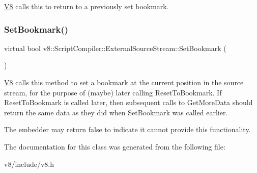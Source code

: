 \mbox{\hyperlink{classv8_1_1V8}{V8}} calls this to return to a previously set bookmark. \mbox{\label{classv8_1_1ScriptCompiler_1_1ExternalSourceStream_a6848508547b3508a2d016738f12561e8}} 
\subsubsection{\texorpdfstring{Set\+Bookmark()}{SetBookmark()}}
{\footnotesize\ttfamily virtual bool v8\+::\+Script\+Compiler\+::\+External\+Source\+Stream\+::\+Set\+Bookmark (\begin{DoxyParamCaption}{ }\end{DoxyParamCaption})\hspace{0.3cm}{\ttfamily [virtual]}}

\mbox{\hyperlink{classv8_1_1V8}{V8}} calls this method to set a \textquotesingle{}bookmark\textquotesingle{} at the current position in the source stream, for the purpose of (maybe) later calling Reset\+To\+Bookmark. If Reset\+To\+Bookmark is called later, then subsequent calls to Get\+More\+Data should return the same data as they did when Set\+Bookmark was called earlier.

The embedder may return \textquotesingle{}false\textquotesingle{} to indicate it cannot provide this functionality. 

The documentation for this class was generated from the following file\+:\begin{DoxyCompactItemize}
\item 
v8/include/v8.\+h\end{DoxyCompactItemize}
